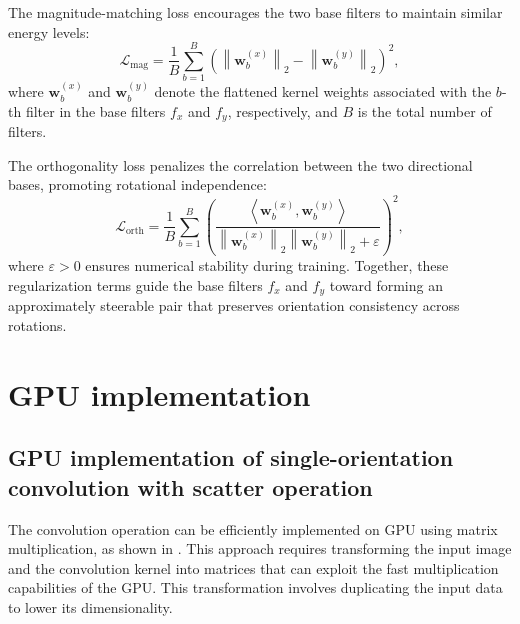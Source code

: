 The magnitude-matching loss encourages the two base filters to maintain similar energy levels:
\begin{equation}
\mathcal{L}_{\text{mag}}
=
\frac{1}{B}
\sum_{b=1}^{B}
\left(
\left\|\mathbf{w}^{(x)}_{b}\right\|_{2}
-
\left\|\mathbf{w}^{(y)}_{b}\right\|_{2}
\right)^{2},
\label{eq:mag_loss}
\end{equation}
where \( \mathbf{w}^{(x)}_{b} \) and \( \mathbf{w}^{(y)}_{b} \) denote the flattened kernel weights associated with 
the \( b \)-th filter in the base filters \( f_x \) and \( f_y \), respectively, and \( B \) is the total number of filters.



The orthogonality loss penalizes the correlation between the two directional bases, promoting rotational independence:
\begin{equation}
\mathcal{L}_{\text{orth}}
=
\frac{1}{B}
\sum_{b=1}^{B}
\left(
\frac{
\left\langle \mathbf{w}^{(x)}_{b}, \mathbf{w}^{(y)}_{b} \right\rangle
}{
\left\|\mathbf{w}^{(x)}_{b}\right\|_{2}
\left\|\mathbf{w}^{(y)}_{b}\right\|_{2}
+ \varepsilon
}
\right)^{2},
\label{eq:orth_loss}
\end{equation}
where \( \varepsilon \!>\! 0 \) ensures numerical stability during training.
Together, these regularization terms guide the base filters \( f_x \) and \( f_y \)
toward forming an approximately steerable pair that preserves orientation consistency across rotations.


\section{GPU implementation}\label{sec:GPU}

\subsection{GPU implementation of single-orientation convolution with scatter operation}\label{sec:GPU}
The convolution operation can be efficiently implemented on GPU using matrix multiplication, as shown in \cite{cudnn-arxiv}. This approach requires transforming the input image and the convolution kernel into matrices that can exploit the fast multiplication capabilities of the GPU. This transformation involves duplicating the input data to lower its dimensionality. 

